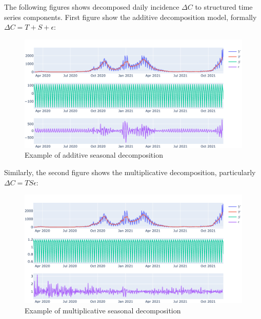 \documentclass[
  digital, %
  oneside, %
  lof,     %
  lot,     %
]{fithesis4}
\begin{document}
The following figures shows decomposed daily incidence 
$\Delta C$ to structured time series components. 
First figure show the additive decomposition model, 
formally $\Delta C = T + S + \epsilon$:

\begin{figure}[h]
  \begin{center}
    \includegraphics[width=\textwidth]{images/seasonal-decomposition-additive.png}
  \end{center}
  \caption{Example of additive seasonal decomposition}
  \label{fig:seasonal-decomposition-additive}
\end{figure}

Similarly, the second figure shows the multiplicative 
decomposition, particularly $\Delta C = T S \epsilon$:

\begin{figure}[h]
  \begin{center}
    \includegraphics[width=\textwidth]{images/seasonal-decomposition-multiplicative.png}
  \end{center}
  \caption{Example of multiplicative seasonal decomposition}
  \label{fig:seasonal-decomposition-multiplicative}
\end{figure}
\end{document}
